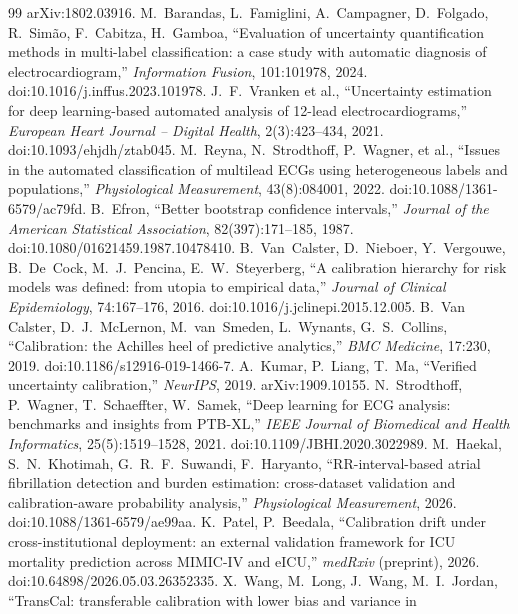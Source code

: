 \documentclass[review,12pt,nonatbib]{elsarticle}
\begin{document}
\begin{thebibliography}{99}
arXiv:1802.03916.
 M.~Barandas, L.~Famiglini, A.~Campagner,
D.~Folgado, R.~Sim\~ao, F.~Cabitza, H.~Gamboa, ``Evaluation of
uncertainty quantification methods in multi-label classification: a
case study with automatic diagnosis of electrocardiogram,''
\emph{Information Fusion}, 101:101978, 2024.
doi:10.1016/j.inffus.2023.101978.
 J.~F.~Vranken et al., ``Uncertainty estimation for
deep learning-based automated analysis of 12-lead
electrocardiograms,'' \emph{European Heart Journal -- Digital Health},
2(3):423--434, 2021. doi:10.1093/ehjdh/ztab045.
 M.~Reyna, N.~Strodthoff, P.~Wagner, et al.,
``Issues in the automated classification of multilead ECGs using
heterogeneous labels and populations,'' \emph{Physiological
Measurement}, 43(8):084001, 2022. doi:10.1088/1361-6579/ac79fd.
 B.~Efron, ``Better bootstrap confidence
intervals,'' \emph{Journal of the American Statistical Association},
82(397):171--185, 1987. doi:10.1080/01621459.1987.10478410.
 B.~Van~Calster, D.~Nieboer, Y.~Vergouwe,
B.~De~Cock, M.~J.~Pencina, E.~W.~Steyerberg, ``A calibration hierarchy for
risk models was defined: from utopia to empirical data,''
\emph{Journal of Clinical Epidemiology}, 74:167--176, 2016.
doi:10.1016/j.jclinepi.2015.12.005.
 B.~Van Calster, D.~J.~McLernon,
M.~van~Smeden, L.~Wynants, G.~S.~Collins, ``Calibration: the Achilles
heel of predictive analytics,'' \emph{BMC Medicine}, 17:230, 2019.
doi:10.1186/s12916-019-1466-7.
 A.~Kumar, P.~Liang, T.~Ma, ``Verified uncertainty
calibration,'' \emph{NeurIPS}, 2019. arXiv:1909.10155.
 N.~Strodthoff, P.~Wagner, T.~Schaeffter,
W.~Samek, ``Deep learning for ECG analysis: benchmarks and insights
from PTB-XL,'' \emph{IEEE Journal of Biomedical and Health
Informatics}, 25(5):1519--1528, 2021.
doi:10.1109/JBHI.2020.3022989.
 M.~Haekal, S.~N.~Khotimah,
G.~R.~F.~Suwandi, F.~Haryanto, ``RR-interval-based atrial fibrillation
detection and burden estimation: cross-dataset validation and
calibration-aware probability analysis,'' \emph{Physiological
Measurement}, 2026. doi:10.1088/1361-6579/ae99aa.
 K.~Patel, P.~Beedala, ``Calibration drift under
cross-institutional deployment: an external validation framework for
ICU mortality prediction across MIMIC-IV and eICU,'' \emph{medRxiv}
(preprint), 2026. doi:10.64898/2026.05.03.26352335.
 X.~Wang, M.~Long, J.~Wang, M.~I.~Jordan,
``TransCal: transferable calibration with lower bias and variance in

\end{thebibliography}
\end{document}

